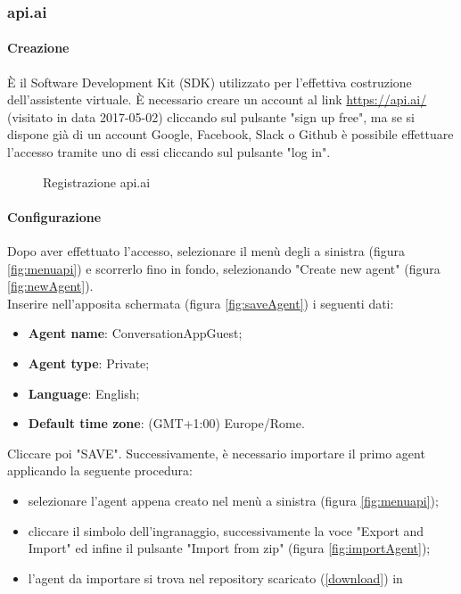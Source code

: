 \subsubsection{api.ai}
\paragraph{Creazione}
È il Software Development Kit (SDK) utilizzato per l'effettiva costruzione dell'assistente virtuale.
È necessario creare un account al link \url{https://api.ai/} (visitato in data 2017-05-02) cliccando sul pulsante "sign up free", ma se si dispone già di un account Google, Facebook, Slack o Github è possibile effettuare l'accesso tramite uno di essi cliccando sul pulsante "log in".
\begin{figure}[h]
	\caption{Registrazione api.ai}
\end{figure}
\newpage
\paragraph{Configurazione}
Dopo aver effettuato l'accesso, selezionare il menù degli  a sinistra (figura \ref{fig:menuapi}) e scorrerlo fino in fondo, selezionando "Create new agent" (figura \ref{fig:newAgent}). \\

Inserire nell'apposita schermata (figura \ref{fig:saveAgent}) i seguenti dati:
\begin{itemize}
	\item \textbf{Agent name}: ConversationAppGuest;
	\item \textbf{Agent type}: Private;
	\item \textbf{Language}: English;
	\item \textbf{Default time zone}: (GMT+1:00) Europe/Rome.
\end{itemize}
Cliccare poi "SAVE".
Successivamente, è necessario importare il primo agent applicando la seguente procedura:
\begin{itemize}
	\item selezionare l'agent appena creato nel menù a sinistra (figura \ref{fig:menuapi});
	\item cliccare il simbolo dell'ingranaggio, successivamente la voce "Export and Import" ed infine il pulsante "Import from zip" (figura \ref{fig:importAgent});
	\item l'agent da importare si trova nel repository scaricato (\ref{download}) in\\ 
\end{itemize}


